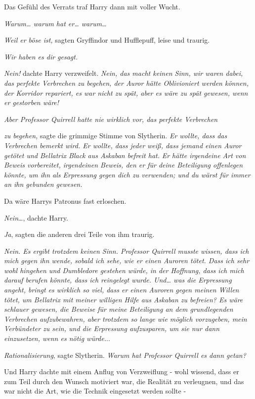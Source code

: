 {Das Gefühl des Verrats traf Harry dann mit voller Wucht.

\emph{Warum… warum hat er… warum…}

\emph{Weil er böse ist,} sagten Gryffindor und Hufflepuff, leise und traurig.

\emph{Wir haben es dir gesagt.}

\emph{Nein!} dachte Harry verzweifelt. \emph{Nein, das macht keinen Sinn, wir waren dabei, das perfekte Verbrechen zu begehen, der Auror hätte Oblivioniert werden können, der Korridor repariert, es war nicht zu spät, aber es wäre zu spät gewesen, wenn er gestorben wäre!}

\emph{Aber Professor Quirrell hatte nie wirklich vor, das perfekte Verbrechen}

\emph{zu begehen,} sagte die grimmige Stimme von Slytherin. \emph{Er wollte, dass das Verbrechen bemerkt wird. Er wollte, dass jeder weiß, dass jemand einen Auror getötet und Bellatrix Black aus Askaban befreit hat.} \emph{Er hätte irgendeine Art von} \emph{Beweis vorbereitet, irgendeinen Beweis, den er für deine Beteiligung offenlegen könnte, um ihn als Erpressung gegen dich zu verwenden; und du wärst für immer an ihn gebunden gewesen.}

Da wäre Harrys Patronus fast erloschen.

\emph{Nein}…, dachte Harry.

\emph{Ja}, sagten die anderen drei Teile von ihm traurig.

\emph{Nein. Es ergibt trotzdem keinen Sinn. Professor Quirrell musste wissen, dass ich mich gegen ihn wende, sobald ich sehe, wie er einen Auroren tötet. Dass ich sehr wohl hingehen und Dumbledore gestehen würde, in der Hoffnung, dass ich mich darauf berufen könnte, dass ich reingelegt wurde. Und… was die Erpressung angeht, bringt es wirklich so viel, dass er einen Auroren gegen meinen Willen tötet, um Bellatrix mit meiner willigen Hilfe aus Askaban zu befreien? Es wäre schlauer gewesen, die Beweise für meine Beteiligung an dem grundlegenden Verbrechen aufzubewahren, aber trotzdem so lange wie möglich vorzugeben, mein Verbündeter zu sein, und die Erpressung aufzusparen, um sie nur dann einzusetzen, wenn es nötig würde.}..

\emph{Rationalisierung}, sagte Slytherin. \emph{Warum hat Professor Quirrell es dann getan?}

Und Harry dachte mit einem Anflug von Verzweiflung - wohl wissend, dass er zum Teil durch den Wunsch motiviert war, die Realität zu verleugnen, und das war nicht die Art, wie die Technik eingesetzt werden sollte -

}
